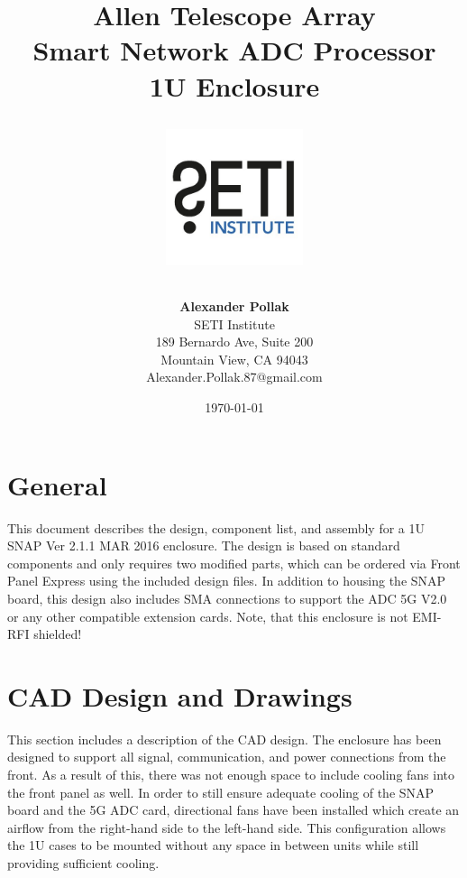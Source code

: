 \documentclass[12pt,a4paper,oneside]{article}
\title{\Huge Allen Telescope Array\\
\vspace{0.5cm}
Smart Network ADC Processor\\1U Enclosure\\
\vspace{0.5cm}
\normalsize \emph{}
\vspace{3.5cm}
\begin{center}
\includegraphics[height=4cm]{titlepage/SETI_institute_logo.jpg}
\end{center}
}
\author{ 
\vspace{1cm}
\Large
\textbf{ Alexander Pollak} \\
SETI Institute \\ 
189 Bernardo Ave, Suite 200 \\
Mountain View, CA 94043 \\ 
Alexander.Pollak.87@gmail.com\\
}
\date{\today}
\begin{document}
\clearpage\maketitle
\thispagestyle{empty}

%



%

\newpage

\section{General}
\label{sec:1}

This document describes the design, component list, and assembly for a 1U SNAP Ver 2.1.1 MAR 2016 enclosure. The design is based on standard components and only requires two modified parts, which can be ordered via Front Panel Express using the included design files. In addition to housing the SNAP board, this design also includes SMA connections to support the ADC 5G V2.0 or any other compatible extension cards. Note, that this enclosure is not EMI-RFI shielded!



\section{CAD Design and Drawings}
\label{sec:2}
This section includes a description of the CAD design. The enclosure has been designed to support all signal, communication, and power connections from the front. As a result of this, there was not enough space to include cooling fans into the front panel as well. In order to still ensure adequate cooling of the SNAP board and the 5G ADC card, directional fans have been installed which create an airflow from the right-hand side to the left-hand side. This configuration allows the 1U cases to be mounted without any space in between units while still providing sufficient cooling.
\end{document}
